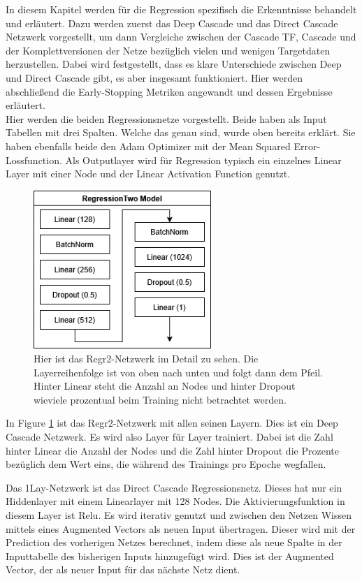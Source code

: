 In diesem Kapitel werden für die Regression spezifisch die Erkenntnisse behandelt und erläutert. Dazu werden zuerst das Deep Cascade und 
das Direct Cascade Netzwerk vorgestellt, um dann Vergleiche zwischen der Cascade TF, Cascade und der Komplettversionen der Netze bezüglich 
vielen und wenigen Targetdaten herzustellen. Dabei wird festgestellt, dass es klare Unterschiede zwischen Deep und Direct Cascade gibt, es aber 
insgesamt funktioniert. Hier werden abschließend die Early-Stopping Metriken angewandt und dessen Ergebnisse erläutert. \\

Hier werden die beiden Regressionsnetze vorgestellt. Beide haben als Input Tabellen mit drei Spalten. 
Welche das genau sind, wurde oben bereits erklärt. Sie haben ebenfalls beide den Adam Optimizer mit der Mean Squared Error-Lossfunction. 
Als Outputlayer wird für Regression typisch ein einzelnes Linear Layer mit einer Node und der Linear Activation Function genutzt. 

\begin{figure}[htpb]
    \centering
    \includegraphics[height=6cm]{../../Graphiken/regressiontwo_2.png}
    \caption{\label{fig:regr2} 
    \small{Hier ist das Regr2-Netzwerk im Detail zu sehen. Die Layerreihenfolge ist von oben nach unten und folgt dann dem Pfeil. Hinter Linear 
    steht die Anzahl an Nodes und hinter Dropout wieviele prozentual beim Training nicht betrachtet werden.}}
\end{figure}

In Figure \ref{fig:regr2} ist das Regr2-Netzwerk mit allen seinen Layern. Dies ist ein Deep Cascade Netzwerk. Es wird also Layer für Layer trainiert. 
Dabei ist die Zahl hinter Linear die Anzahl der Nodes und die Zahl hinter 
Dropout die Prozente bezüglich dem Wert eins, die während des Trainings pro Epoche wegfallen. 

Das 1Lay-Netzwerk ist das Direct Cascade Regressionsnetz. Dieses hat nur ein Hiddenlayer mit einem Linearlayer mit 128 Nodes. Die 
Aktivierungsfunktion in diesem Layer ist Relu. Es wird iterativ genutzt und zwischen den Netzen Wissen mittels eines Augmented Vectors als 
neuen Input übertragen. 
Dieser wird mit der Prediction des vorherigen Netzes berechnet, indem diese als neue Spalte in der Inputtabelle des bisherigen Inputs hinzugefügt 
wird. Dies ist der Augmented Vector, der als neuer Input für das nächste Netz dient. 

